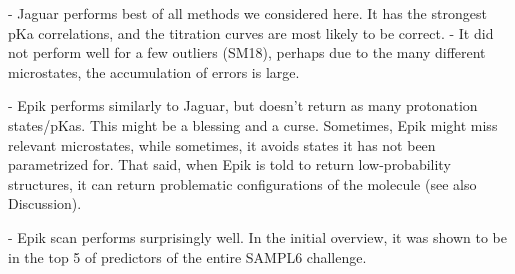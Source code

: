 \documentclass[9pt,lineno,final]{elife}
\begin{document}
- Jaguar performs best of all methods we considered here. It has the strongest pKa correlations, and the titration curves are most likely to be correct.
- It did not perform well for a few outliers (SM18), perhaps due to the many different microstates, the accumulation of errors is large.


- Epik performs similarly to Jaguar, but doesn't return as many protonation states/pKas. This might be a blessing and a curse. Sometimes, Epik might miss relevant microstates, while sometimes,
it avoids states it has not been parametrized for. That said,
when Epik is told to return low-probability structures, it can return
problematic configurations of the molecule (see also Discussion).

- Epik scan performs surprisingly well. In the initial overview, it was shown to be in the top 5 of predictors of the entire SAMPL6 challenge.
\end{document}
